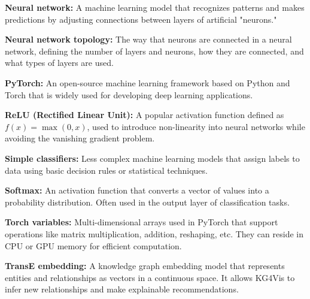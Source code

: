 \vspace{0.3cm}
\noindent\textbf{Neural network:} A machine learning model that recognizes patterns and makes predictions by adjusting connections between layers of artificial "neurons."

\vspace{0.3cm}
\noindent\textbf{Neural network topology:} The way that neurons are connected in a neural network, defining the number of layers and neurons, how they are connected, and what types of layers are used.

\vspace{0.3cm}
\noindent\textbf{PyTorch:} An open-source machine learning framework based on Python and Torch that is widely used for developing deep learning applications.

\vspace{0.3cm}
\noindent\textbf{ReLU (Rectified Linear Unit):} A popular activation function defined as \( f(x) = \max(0, x) \), used to introduce non-linearity into neural networks while avoiding the vanishing gradient problem.

\vspace{0.3cm}
\noindent\textbf{Simple classifiers:} Less complex machine learning models that assign labels to data using basic decision rules or statistical techniques.

\vspace{0.3cm}
\noindent\textbf{Softmax:} An activation function that converts a vector of values into a probability distribution. Often used in the output layer of classification tasks.

\vspace{0.3cm}
\noindent\textbf{Torch variables:} Multi-dimensional arrays used in PyTorch that support operations like matrix multiplication, addition, reshaping, etc. They can reside in CPU or GPU memory for efficient computation.

\vspace{0.3cm}
\noindent\textbf{TransE embedding:} A knowledge graph embedding model that represents entities and relationships as vectors in a continuous space. It allows KG4Vis to infer new relationships and make explainable recommendations.
